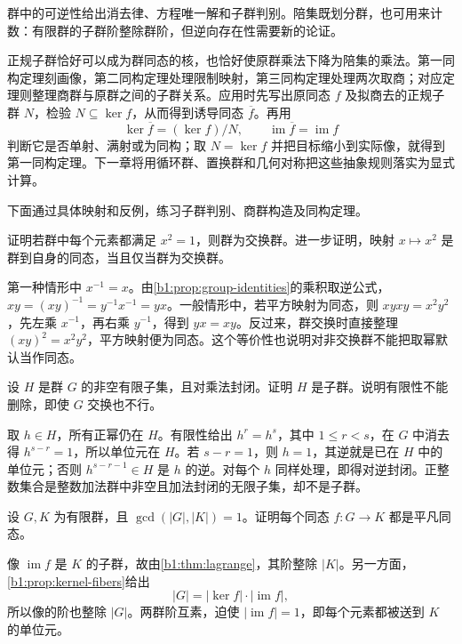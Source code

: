 \begin{chaptersummary}
	群中的可逆性给出消去律、方程唯一解和子群判别。陪集既划分群，也可用来计数：有限群的子群阶整除群阶，但逆向存在性需要新的论证。

	\ProseParagraphBreak
	正规子群恰好可以成为群同态的核，也恰好使原群乘法下降为陪集的乘法。第一同构定理刻画像，第二同构定理处理限制映射，第三同构定理处理两次取商；对应定理则整理商群与原群之间的子群关系。应用时先写出原同态 \(f\) 及拟商去的正规子群 \(N\)，检验 \(N\subseteq\ker f\)，从而得到诱导同态 \(\overline f\)。再用
	\[
		\ker\overline f=(\ker f)/N, \qquad \operatorname{im}\overline f=\operatorname{im}f
	\]
	判断它是否单射、满射或为同构；取 \(N=\ker f\) 并把目标缩小到实际像，就得到第一同构定理。下一章将用循环群、置换群和几何对称把这些抽象规则落实为显式计算。
\end{chaptersummary}

\BookExercises

下面通过具体映射和反例，练习子群判别、商群构造及同构定理。

\begin{exercise}\label{b1:ex:02-squaring}
	证明若群中每个元素都满足 \(x^2=1\)，则群为交换群。进一步证明，映射 \(x\mapsto x^2\) 是群到自身的同态，当且仅当群为交换群。
\end{exercise}
\begin{solution}
	第一种情形中 \(x^{-1}=x\)。由\cref{b1:prop:group-identities}的乘积取逆公式， \(xy=(xy)^{-1}=y^{-1}x^{-1}=yx\)。一般情形中，若平方映射为同态，则 \(xyxy=x^2y^2\)，先左乘 \(x^{-1}\)，再右乘 \(y^{-1}\)，得到 \(yx=xy\)。反过来，群交换时直接整理 \((xy)^2=x^2y^2\)，平方映射便为同态。这个等价性也说明对非交换群不能把取幂默认当作同态。
\end{solution}

\begin{exercise}\label{b1:ex:02-finite-closed}
	设 \(H\) 是群 \(G\) 的非空有限子集，且对乘法封闭。证明 \(H\) 是子群。说明有限性不能删除，即使 \(G\) 交换也不行。
\end{exercise}
\begin{solution}
	取 \(h\in H\)，所有正幂仍在 \(H\)。有限性给出 \(h^r=h^s\)，其中 \(1\leq r<s\)，在 \(G\) 中消去得 \(h^{s-r}=1\)，所以单位元在 \(H\)。若 \(s-r=1\)，则 \(h=1\)，其逆就是已在 \(H\) 中的单位元；否则 \(h^{s-r-1}\in H\) 是 \(h\) 的逆。对每个 \(h\) 同样处理，即得对逆封闭。正整数集合是整数加法群中非空且加法封闭的无限子集，却不是子群。
\end{solution}

\begin{exercise}\label{b1:ex:02-coprime-orders-homomorphism}
	设 \(G,K\) 为有限群，且 \(\gcd(\lvert G\rvert,\lvert K\rvert)=1\)。证明每个同态 \(f:G\rightarrow K\) 都是平凡同态。
\end{exercise}
\begin{solution}
	像 \(\operatorname{im}f\) 是 \(K\) 的子群，故由\cref{b1:thm:lagrange}，其阶整除 \(\lvert K\rvert\)。另一方面，\cref{b1:prop:kernel-fibers}给出
	\[
		\lvert G\rvert=\lvert\ker f\rvert\cdot\lvert\operatorname{im}f\rvert,
	\]
	所以像的阶也整除 \(\lvert G\rvert\)。两群阶互素，迫使 \(\lvert\operatorname{im}f\rvert=1\)，即每个元素都被送到 \(K\) 的单位元。
\end{solution}

